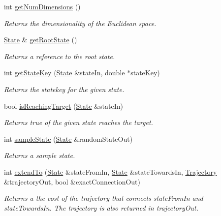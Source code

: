 \begin{DoxyCompactItemize}
\item 
int \hyperlink{class_single_integrator_1_1_system_acb69c293712138b9624c8e77b19a41a7}{get\-Num\-Dimensions} ()
\begin{DoxyCompactList}\small\item\em Returns the dimensionality of the Euclidean space. \end{DoxyCompactList}\item 
\hyperlink{class_single_integrator_1_1_state}{State} \& \hyperlink{class_single_integrator_1_1_system_a9d814c84c26bd48c286c66352030e695}{get\-Root\-State} ()
\begin{DoxyCompactList}\small\item\em Returns a reference to the root state. \end{DoxyCompactList}\item 
int \hyperlink{class_single_integrator_1_1_system_a537a5a43d127e9680ac222b313621373}{get\-State\-Key} (\hyperlink{class_single_integrator_1_1_state}{State} \&state\-In, double $\ast$state\-Key)
\begin{DoxyCompactList}\small\item\em Returns the statekey for the given state. \end{DoxyCompactList}\item 
bool \hyperlink{class_single_integrator_1_1_system_a61f712ecec2be0d5a692016a98883505}{is\-Reaching\-Target} (\hyperlink{class_single_integrator_1_1_state}{State} \&state\-In)
\begin{DoxyCompactList}\small\item\em Returns true of the given state reaches the target. \end{DoxyCompactList}\item 
int \hyperlink{class_single_integrator_1_1_system_af69e823ebff537fd14b7129de2d8d24d}{sample\-State} (\hyperlink{class_single_integrator_1_1_state}{State} \&random\-State\-Out)
\begin{DoxyCompactList}\small\item\em Returns a sample state. \end{DoxyCompactList}\item 
int \hyperlink{class_single_integrator_1_1_system_ae6e8fe1ab14336405695ff03e09280cd}{extend\-To} (\hyperlink{class_single_integrator_1_1_state}{State} \&state\-From\-In, \hyperlink{class_single_integrator_1_1_state}{State} \&state\-Towards\-In, \hyperlink{class_single_integrator_1_1_trajectory}{Trajectory} \&trajectory\-Out, bool \&exact\-Connection\-Out)
\begin{DoxyCompactList}\small\item\em Returns a the cost of the trajectory that connects state\-From\-In and state\-Towards\-In. The trajectory is also returned in trajectory\-Out. \end{DoxyCompactList}\item 

\end{DoxyCompactItemize}
